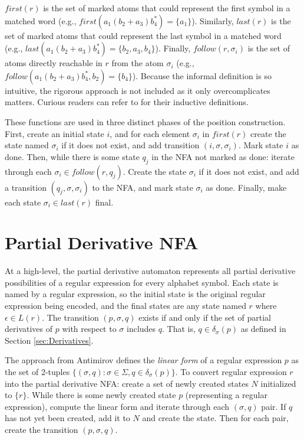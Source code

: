 $first(r)$ is the set of marked atoms that could represent the first symbol in a matched word (e.g., $first(a_1(b_2+a_3)b_4^*) = \{a_1\}$). Similarly, $last(r)$ is the set of marked atoms that could represent the last symbol in a matched word (e.g., $last(a_1(b_2+a_3)b_4^*) = \{b_2, a_3, b_4\}$). Finally, $follow(r, \sigma_i)$ is the set of atoms directly reachable in $r$ from the atom $\sigma_i$ (e.g., $follow(a_1(b_2+a_3)b_4^*, b_2) = \{b_4\}$). Because the informal definition is so intuitive, the rigorous approach is not included as it only overcomplicates matters. Curious readers can refer to \cite{follow} for their inductive definitions.

These functions are used in three distinct phases of the position construction. 
First, create an initial state $i$, and for each element $\sigma_i$ in $first(r)$ create the state named $\sigma_i$ if it does not exist, and add transition $(i, \sigma, \sigma_i)$. Mark state $i$ as done.
Then, while there is some state $q_j$ in the NFA not marked as done: iterate through each $\sigma_i \in follow(r, q_j)$. Create the state $\sigma_i$ if it does not exist, and add a transition $(q_j, \sigma, \sigma_i)$ to the NFA, and mark state $\sigma_i$ as done.
Finally, make each state $\sigma_i \in last(r)$ final.





\section{Partial Derivative NFA}
\label{sec:Partial Derivative NFA}
At a high-level, the partial derivative automaton represents all partial derivative possibilities of a regular expression for every alphabet symbol. Each state is named by a regular expression, so the initial state is the original regular expression being encoded, and the final states are any state named $r$ where $\epsilon \in L(r)$. The transition $(p, \sigma, q)$ exists if and only if the set of partial derivatives of $p$ with respect to $\sigma$ includes $q$. That is, $q \in \delta_\sigma(p)$ as defined in Section \ref{sec:Derivatives}.

The approach from Antimirov \cite{Antimirov} defines the \emph{linear form} of a regular expression $p$ as the set of 2-tuples $\{(\sigma, q) : \sigma\in\Sigma, q\in\delta_\sigma(p)\}$. To convert regular expression $r$ into the partial derivative NFA: create a set of newly created states $N$ initialized to $\{r\}$. While there is some newly created state $p$ (representing a regular expression), compute the linear form and iterate through each $(\sigma, q)$ pair. If $q$ has not yet been created, add it to $N$ and create the state. Then for each pair, create the transition $(p, \sigma, q)$.

